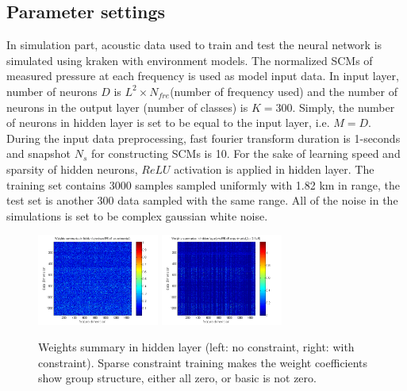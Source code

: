 \subsection{Parameter settings}
In simulation part, acoustic data used to train and test the neural network is simulated using kraken\cite{porter1992kraken} with environment models. The normalized SCMs of measured pressure at each frequency is used as model input data. In input layer, number of neurons $D$ is $L^{2} \times N_{fre}$(number of frequency used) and the number of neurons in the output layer (number of classes) is $K = 300$. Simply, the number of neurons in hidden layer is set to be equal to the input layer, i.e. $M = D$. During the input data preprocessing, fast fourier transform duration is 1-seconds and snapshot $N_{s}$ for constructing SCMs is 10.
For the sake of learning speed and sparsity of hidden neurons, $ReLU$ activation\cite{goodfellow2016deep} is applied in hidden layer.
The training set contains 3000 samples sampled uniformly with 1.82 km in range, the test set is another 300 data sampled with the same range. All of the noise in the simulations is set to be complex gaussian white noise.
\begin{figure}
\includegraphics[width=4cm,height=3cm]{figure/Weights_summaries_in_hidden_laye_swell_exp}
\includegraphics[width=4cm,height=3cm]{figure/Weights_summaries_in_hidden_layer_swell_exp_lambda_2_dot_1e_neg_5}
\caption{Weights summary in hidden layer (left: no constraint, right: with constraint). Sparse constraint
training makes the weight coefficients show group structure, either all zero, or basic is not zero.}
\end{figure}
